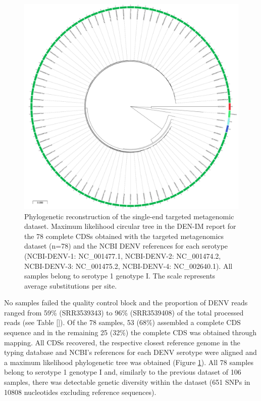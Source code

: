 \begin{figure}[h!]
\centering
\includegraphics[width=\textwidth]{figures/chapter 4/Figure4.pdf}
\caption{Phylogenetic reconstruction of the single-end targeted metagenomic dataset. Maximum likelihood circular tree in the DEN-IM report for the 78 complete CDSs obtained with the targeted metagenomics dataset (n=78) and the NCBI DENV references for each serotype (NCBI-DENV-1: NC\_001477.1, NCBI-DENV-2: NC\_001474.2, NCBI-DENV-3: NC\_001475.2, NCBI-DENV-4: NC\_002640.1). All samples belong to serotype 1 genotype I. The scale represents average substitutions per site.}
\label{fig:chap4_figure4}
\end{figure}

No samples failed the quality control block and the proportion of DENV reads ranged from 59\% (SRR3539343) to 96\% (SRR3539408) of the total processed reads (see Table \ref{}). Of the 78 samples, 53 (68\%) assembled a complete CDS sequence and in the remaining 25 (32\%) the complete CDS was obtained through mapping. All CDSs recovered, the respective closest reference genome in the typing database and NCBI’s references for each DENV serotype were aligned and a maximum likelihood phylogenetic tree was obtained (Figure \ref{fig:chap4_figure4}). All 78 samples belong to serotype 1 genotype I and, similarly to the previous dataset of 106 samples, there was detectable genetic diversity within the dataset (651 SNPs in 10808 nucleotides excluding reference sequences).


